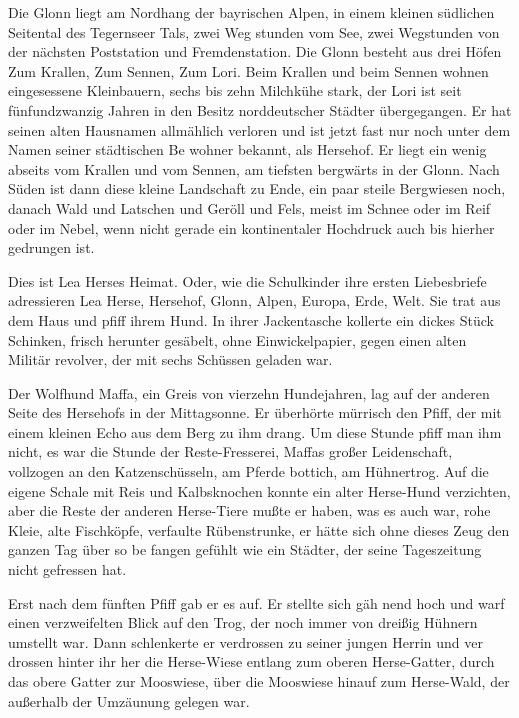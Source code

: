 Die Glonn liegt am Nordhang der bayrischen Alpen, in einem
kleinen südlichen Seitental des Tegernseer Tals, zwei Weg\-%
stunden vom See, zwei Wegstunden von der nächsten Post\-station
und Fremdenstation. Die Glonn besteht aus drei
Höfen\dopp{} Zum Krallen, Zum Sennen, Zum Lori. Beim Krallen
und beim Sennen wohnen eingesessene Kleinbauern, sechs
bis zehn Milchkühe stark, der Lori ist seit fünfundzwanzig
Jahren in den Besitz norddeutscher Städter übergegangen.
Er hat seinen alten Hausnamen allmählich verloren und ist
jetzt fast nur noch unter dem Namen seiner städtischen Be\-%
wohner bekannt, als Hersehof. Er liegt ein wenig abseits vom
Krallen und vom Sennen, am tiefsten bergwärts in der
Glonn. Nach Süden ist dann diese kleine Landschaft zu Ende,
ein paar steile Bergwiesen noch, danach Wald und Latschen
und Geröll und Fels, meist im Schnee oder im Reif oder im
Nebel, wenn nicht gerade ein kontinentaler Hochdruck auch bis
hierher gedrungen ist.

Dies ist Lea Herses Heimat. Oder, wie die Schulkinder ihre
ersten Liebesbriefe adressieren\dopp{} Lea Herse, Hersehof, Glonn,
Alpen, Europa, Erde, Welt.
\abstand{}
Sie trat aus dem Haus und pfiff ihrem Hund. In ihrer
Jackentasche kollerte ein dickes Stück Schinken, frisch herunter\-%
gesäbelt, ohne Einwickelpapier, gegen einen alten Militär\-%
revolver, der mit sechs Schüssen geladen war.

Der Wolfhund Maffa, ein Greis von vierzehn Hundejahren,
lag auf der anderen Seite des Hersehofs in der Mittagsonne.
Er überhörte mürrisch den Pfiff, der mit einem kleinen Echo
aus dem Berg zu ihm drang. Um diese Stunde pfiff man ihm
nicht, es war die Stunde der Reste-Fresserei, Maffas großer
Leidenschaft, vollzogen an den Katzenschüsseln, am Pferde\-%
bottich, am Hühnertrog. Auf die eigene Schale mit Reis und
Kalbsknochen konnte ein alter Herse-Hund verzichten, aber
die Reste der anderen Herse-Tiere mußte er haben, was es
auch war, rohe Kleie, alte Fischköpfe, verfaulte Rübenstrunke,
er hätte sich ohne dieses Zeug den ganzen Tag über so be\-%
fangen gefühlt wie ein Städter, der seine Tageszeitung nicht
gefressen hat.

Erst nach dem fünften Pfiff gab er es auf. Er stellte sich gäh\-%
nend hoch und warf einen verzweifelten Blick auf den Trog,
der noch immer von dreißig Hühnern umstellt war. Dann
schlenkerte er verdrossen zu seiner jungen Herrin und ver\-%
drossen hinter ihr her\dopp{} die Herse-Wiese entlang zum oberen
Herse-Gatter, durch das obere Gatter zur Mooswiese, über
die Mooswiese hinauf zum Herse-Wald, der außerhalb der
Umzäunung gelegen war.

